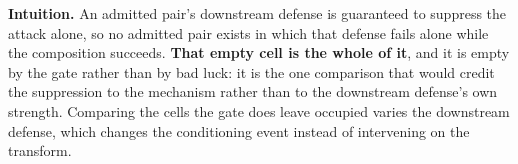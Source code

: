 \documentclass{article}
\begin{document}
\noindent \textbf{Intuition.} An admitted pair's downstream defense is guaranteed to suppress the attack alone, so no admitted pair exists in which that defense fails alone while the composition succeeds. \textbf{That empty cell is the whole of it}, and it is empty by the gate rather than by bad luck: it is the one comparison that would credit the suppression to the mechanism rather than to the downstream defense's own strength. Comparing the cells the gate does leave occupied varies the downstream defense, which changes the conditioning event instead of intervening on the transform.
\end{document}
